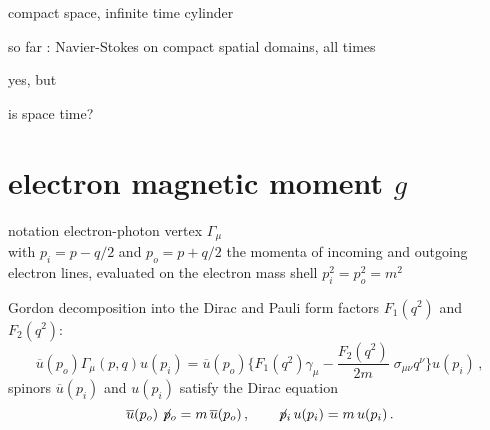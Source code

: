 \begin{frame}{compact space, infinite time cylinder}
\begin{center}
\end{center}
so far : Navier-Stokes on compact spatial domains, all times
\end{frame}

\begin{frame}{yes, but}
\begin{center}
{\huge is space time?}
\end{center}
\end{frame}

\section[electron magnetic moment $g$]
{electron magnetic moment $g$}


\begin{frame}{notation}
electron-photon vertex $\Gamma_{\mu}$\\
with $p_{i}=p-q/2$ and $p_{o}=p+q/2$ the momenta of
incoming and outgoing electron lines, evaluated on the electron mass
shell $p_{i}^2=p_{o}^2=m^2$
\medskip

Gordon decomposition into the Dirac
and Pauli form factors $F_1(q^2)$ and $F_2(q^2)$:
\[
\overline{u}(p_{o}) \Gamma_{\mu}(p,q) %
u(p_{i})
    =    %
\overline{u}(p_{o}) \Bigg\{ F_1(q^2) \gamma_{\mu} -
\frac{F_2 (q^2)}{2m} \; \sigma_{\mu \nu} q^{\nu} \Bigg\} u(p_{i}) \,,
\] %
spinors  $\overline{u}(p_{i})$ and $u(p_{i})$  satisfy the Dirac
equation
\[
\overline{u}(p_{o}) \not\!{p}_{o} = m \, \overline{u}(p_{o})
\,, \qquad
\not\!{p}_{i} \, u(p_{i})  =  m \, u(p_{i}) \,.
\]
\end{frame}


